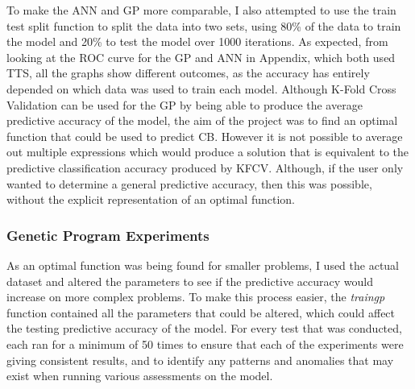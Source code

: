 \documentclass[11pt]{article}
\begin{document}
To make the ANN and GP more comparable, I also attempted to use the train test split function to split the data into two sets, using 80\% of the data to train the model and 20\% to test the model over 1000 iterations.  As expected, from looking at the ROC curve for the GP and ANN in Appendix, which both used TTS, all the graphs show different outcomes, as the accuracy has entirely depended on which data was used to train each model. 
Although K-Fold Cross Validation can be used for the GP by being able to produce the average predictive accuracy of the model, the aim of the project was to find an optimal function that could be used to predict CB. However it is not possible to average out multiple expressions which would produce a solution that is equivalent to the predictive classification accuracy produced by KFCV. Although, if the user only wanted to determine a general predictive accuracy, then this was possible, without the explicit representation of an optimal function. 
\subsubsection{Genetic Program Experiments}\label{subsubsec:GPE}
As an optimal function was being found for smaller problems, I used the actual dataset and altered the parameters to see if the predictive accuracy would increase on more complex problems. To make this process easier, the \textit{train\textunderscore gp} function contained all the parameters that could be altered, which could affect the testing predictive accuracy of the model. For every test that was conducted, each ran for a minimum of
50 times to ensure that each of the experiments were giving consistent results, and to identify any patterns and anomalies that may exist when running various assessments on the model.   \\
\end{document}
